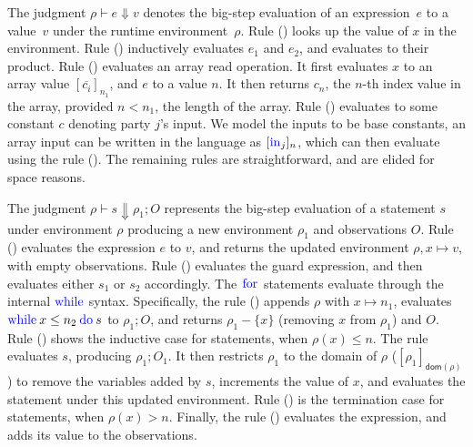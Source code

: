 The judgment $\rho \vdash e \Downarrow v$ denotes the big-step
evaluation of an expression~$e$ to a value~$v$ under the runtime
environment~$\rho$. Rule ({}) looks up the value of $x$ in
the environment. Rule ({}) inductively evaluates $e_{1}$ and
$e_{2}$, and evaluates to their product. Rule ({})
evaluates an array read operation. It first evaluates $x$ to an array
value $[\overline{c_{i}}]_{n_{1}}$, and $e$ to a  value
$n$. It then returns $c_{n}$, the $n$-th index value in the array,
provided $n < n_{1}$, the length of the array. Rule ({})
evaluates to some constant $c$ denoting party $j$'s input. We model
the inputs to be base constants, an array input can be written in the
language as $[\kw{in}_{j}]_{n}$, which can then evaluate using the
rule ({}). The remaining rules are straightforward, and are
elided for space reasons.

The judgment $\rho \vdash s \Downarrow \rho_{1}; O$ represents the
big-step evaluation of a statement $s$ under environment $\rho$
producing a new environment $\rho_{1}$ and observations $O$. Rule
({}) evaluates the expression $e$ to $v$, and returns the
updated environment $\rho,x \mapsto v$, with empty observations. Rule
({}) evaluates the guard expression, and then evaluates
either $s_{1}$ or $s_{2}$ accordingly. The $\kw{for}$ statements evaluate
through the internal $\kw{while}$ syntax. Specifically, the rule
({}) appends $\rho$ with $x\mapsto n_{1}$,
evaluates $\loops{x}{n_{2}}{s}$ to $\rho_{1}; O$, and returns
$\rho_{1} - \{x\}$ (removing $x$ from $\rho_{1}$) and $O$. Rule
({}) shows the inductive case for 
statements, when $\rho(x) \leq n$. The rule evaluates $s$, producing
$\rho_{1}; O_{1}$. It then restricts $\rho_{1}$ to the domain of
$\rho$ ($[\rho_{1}]_{\mathsf{dom}(\rho)}$) to remove the variables
added by $s$, increments the value of $x$, and evaluates the
 statement under this updated environment. Rule
({}) is the termination case for  statements,
when $\rho(x) > n$. Finally, the rule ({}) evaluates the
expression, and adds its value to the observations.

\newcommand{\lcond}[4]{\ensuremath{{{#2}\:?_{{#1}}\:{#3}\::{#4}}}}

